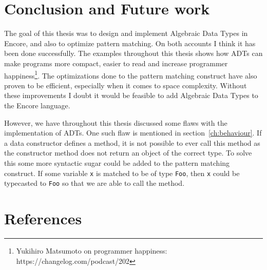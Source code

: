 \documentclass[10pt]{report}
\def\code#1{\texttt{#1}} %
\begin{document}
{\chapter{Conclusion and Future work}
\par{The goal of this thesis was to design and implement Algebraic Data Types in Encore, and also to optimize pattern matching. On both accounts I think it has been done successfully. The examples throughout this thesis shows how ADTs can make programs more compact, easier to read and increase programmer happiness\footnote{Yukihiro Matsumoto on programmer happiness: https://changelog.com/podcast/202}. The optimizations done to the pattern matching construct have also proven to be efficient, especially when it comes to space complexity. Without these improvements I doubt it would be feasible to add Algebraic Data Types to the Encore language.}
\par{However, we have throughout this thesis discussed some flaws with the implementation of ADTs. One such flaw is mentioned in section~\ref{ch:behaviour}. If a data constructor defines a method, it is not possible to ever call this method as the constructor method does not return an object of the correct type. To solve this some more syntactic sugar could be added to the pattern matching construct. If some variable \code{x} is matched to be of type \code{Foo}, then \code{x} could be typecasted to \code{Foo} so that we are able to call the method.}

\chapter{References}






}
\end{document}
